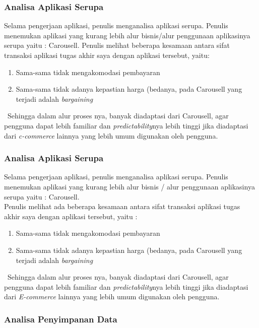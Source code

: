 	\subsubsection{Analisa Aplikasi Serupa}
	\label{alasan-app-serupa}
		Selama pengerjaan aplikasi, penulis menganalisa aplikasi serupa. Penulis menemukan aplikasi yang kurang lebih alur bisnis/alur penggunaan aplikasinya serupa yaitu : Carousell. Penulis melihat beberapa kesamaan antara sifat transaksi aplikasi tugas akhir saya dengan aplikasi tersebut, yaitu:
		\begin{enumerate}
			\item Sama-sama tidak mengakomodasi pembayaran
			\item Sama-sama tidak adanya kepastian harga (bedanya, pada Carousell yang terjadi adalah \textit{bargaining}
		\end{enumerate} \
		\indent Sehingga dalam alur proses nya, banyak diadaptasi dari Carousell, agar pengguna dapat lebih familiar dan \textit{predictability}nya lebih tinggi jika diadaptasi dari \textit{c-commerce} lainnya yang lebih umum digunakan oleh pengguna.
		
	
	\subsubsection{Analisa Aplikasi Serupa}
	\label{alasan-app-serupa}
	Selama pengerjaan aplikasi, penulis menganalisa aplikasi serupa. Penulis menemukan aplikasi yang kurang lebih alur bisnis / alur penggunaan aplikasinya serupa yaitu : Carousell. \\
	\indent Penulis melihat ada beberapa kesamaan antara sifat transaksi aplikasi tugas akhir saya dengan aplikasi tersebut, yaitu :
	\begin{enumerate}
		\item Sama-sama tidak mengakomodasi pembayaran
		\item Sama-sama tidak adanya kepastian harga (bedanya, pada Carousell yang terjadi adalah \textit{bargaining}
	\end{enumerate}
	\ \indent Sehingga dalam alur proses nya, banyak diadaptasi dari Carousell, agar pengguna dapat lebih familiar dan \textit{predictability}nya lebih tinggi jika diadaptasi dari \textit{E-commerce} lainnya yang lebih umum digunakan oleh pengguna.
	
	\subsubsection{Analisa Penyimpanan Data}
	
